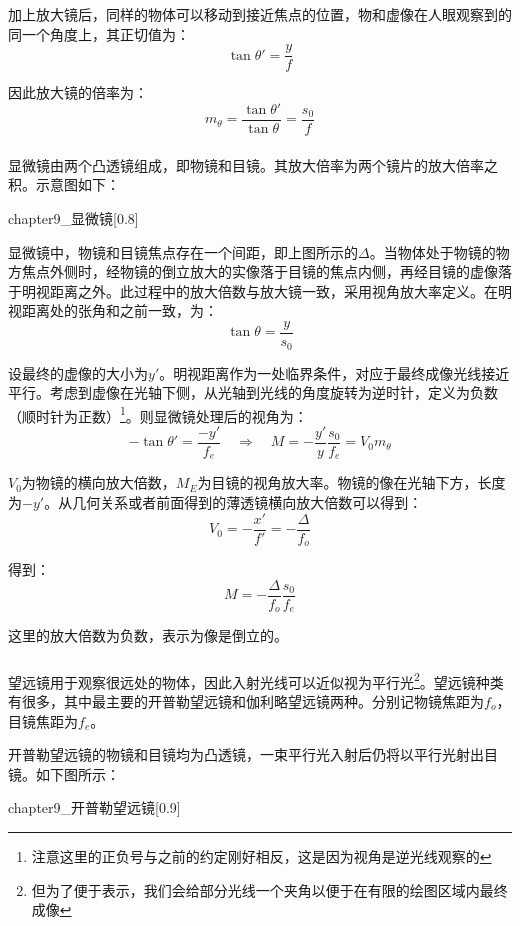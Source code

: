 加上放大镜后，同样的物体可以移动到接近焦点的位置，物和虚像在人眼观察到的同一个角度上，其正切值为：
\[\tan \theta' = \dfrac{y}{f}\]

因此放大镜的倍率为：
\[m_{\theta} = \dfrac{\tan \theta'}{\tan \theta} = \dfrac{s_0}{f}\]

\subsubsection[显微镜]{}
显微镜由两个凸透镜组成，即物镜和目镜。其放大倍率为两个镜片的放大倍率之积。示意图如下：
\begin{singlefigure}[显微镜示意图]{chapter9_显微镜}[0.8]
\end{singlefigure}

显微镜中，物镜和目镜焦点存在一个间距，即上图所示的$\Delta$。当物体处于物镜的物方焦点外侧时，经物镜的倒立放大的实像落于目镜的焦点内侧，再经目镜的虚像落于明视距离之外。此过程中的放大倍数与放大镜一致，采用视角放大率定义。在明视距离处的张角和之前一致，为：
\[\tan\theta = \dfrac{y}{s_0}\]

设最终的虚像的大小为$y'$。明视距离作为一处临界条件，对应于最终成像光线接近平行。考虑到虚像在光轴下侧，从光轴到光线的角度旋转为逆时针，定义为负数（顺时针为正数）\footnote{注意这里的正负号与之前的约定刚好相反，这是因为视角是逆光线观察的}。则显微镜处理后的视角为：
\[-\tan \theta' = \dfrac{-y'}{f_e}\quad\Rightarrow\quad M = -\dfrac{y'}{y}\dfrac{s_0}{f_e} = V_0 m_\theta\]

$V_0$为物镜的横向放大倍数，$M_E$为目镜的视角放大率。物镜的像在光轴下方，长度为$-y'$。从几何关系或者前面得到的薄透镜横向放大倍数可以得到：
\[V_0 = -\dfrac{x'}{f'} = -\dfrac{\Delta}{f_o}\]

得到：
\[M = -\dfrac{\Delta}{f_o}\dfrac{s_0}{f_e}\]

这里的放大倍数为负数，表示为像是倒立的。
\subsubsection[望远镜]{}
望远镜用于观察很远处的物体，因此入射光线可以近似视为平行光\footnote{但为了便于表示，我们会给部分光线一个夹角以便于在有限的绘图区域内最终成像}。望远镜种类有很多，其中最主要的开普勒望远镜和伽利略望远镜两种。分别记物镜焦距为$f_o$，目镜焦距为$f_e$。

开普勒望远镜的物镜和目镜均为凸透镜，一束平行光入射后仍将以平行光射出目镜。如下图所示：
\begin{singlefigure}[开普勒望远镜示意图]{chapter9_开普勒望远镜}[0.9]
\end{singlefigure}

